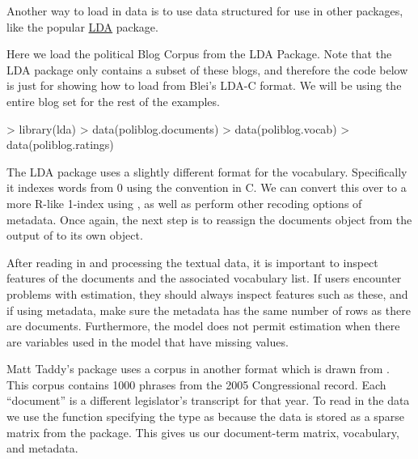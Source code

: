 \documentclass[nojss]{jss}
\begin{document}
Another way to load in data is to use data structured for use in other packages, like the popular \href{http://cran.r-project.org/web/packages/lda/}{LDA} package.

Here we load the political Blog Corpus from the LDA Package. Note that the LDA package only contains a subset of these blogs, and therefore the code below is just for showing how to load from Blei's LDA-C format.  We will be using the entire blog set for the rest of the examples.

\begin{Schunk}
\begin{Sinput}
> library(lda)
> data(poliblog.documents)
> data(poliblog.vocab)
> data(poliblog.ratings)
\end{Sinput}
\end{Schunk}


The LDA package uses a slightly different format for the vocabulary. Specifically it indexes words from 0 using the convention in C. We can convert this over to a more R-like 1-index using , as well as perform other recoding options of metadata. Once again, the next step is to reassign the documents object from the output of  to its own object.

\begin{Schunk}
\end{Schunk}


After reading in and processing the textual data, it is important to inspect features of the documents and the associated vocabulary list. If users encounter problems with estimation, they should always inspect features such as these, and if using metadata, make sure the metadata has the same number of rows as there are documents. Furthermore, the model does not permit estimation when there are variables used in the model that have missing values.

Matt Taddy's  package uses a corpus in another format which is drawn from \citet{gentzkow2010drives}. This corpus contains 1000 phrases from the 2005 Congressional record. Each ``document'' is a different legislator's transcript for that year. To read in the data we use the  function specifying the type as  because the data is stored as a sparse matrix from the  package. This gives us our document-term matrix, vocabulary, and metadata.
\end{document}
